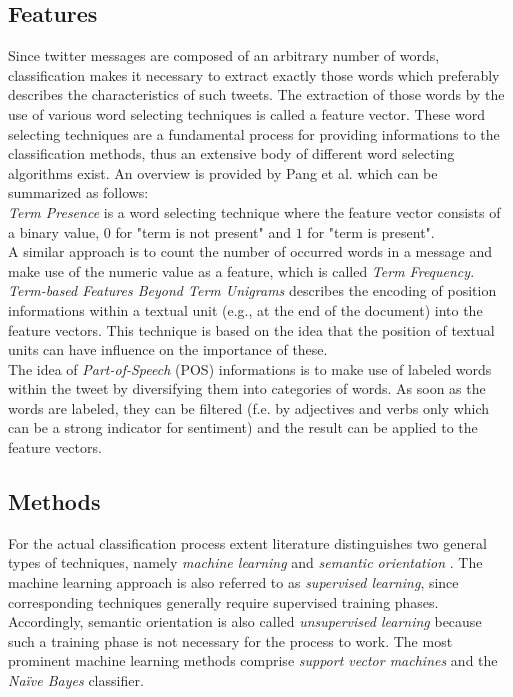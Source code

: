 \subsection{Features}
Since twitter messages are composed of an arbitrary number of words, classification makes it necessary to extract exactly those words which preferably describes the characteristics of such tweets. The extraction of those words by the use of various word selecting techniques is called a  feature vector. These word selecting techniques are a fundamental process for providing informations to the classification methods, thus an extensive body of different word selecting algorithms exist. An overview is provided by Pang et al. \autocite{Pang2008} which can be summarized as follows:\\
\emph{Term Presence} is a word selecting technique where the feature vector consists of a binary value, $0$ for "term is not present" and $1$ for "term is present".\\
A similar approach is to count the number of occurred words in a message and make use of the numeric value as a feature, which is called \emph{Term Frequency}.\\
\emph{Term-based Features Beyond Term Unigrams} describes the encoding of position informations within a textual unit (e.g., at the end of the document)  into the feature vectors. This technique is based on the idea that the position of textual units can have influence on the importance of these.\\
The idea of \emph{Part-of-Speech} (POS) informations is to make use of labeled words within the tweet by diversifying them into categories of words. As soon as the words are labeled, they can be filtered (f.e. by adjectives and verbs only which can be a strong indicator for sentiment) and the result can be applied to the feature vectors.\\

\subsection{Methods}

For the actual classification process extent literature distinguishes two general types of techniques, namely \emph{machine learning} and \emph{semantic orientation} \cite{Ye20096527}. The machine learning approach is also referred to as \emph{supervised learning}, since corresponding techniques generally require supervised training phases. Accordingly, semantic orientation is also called \emph{unsupervised learning} because such a training phase is not necessary for the process to work. The most prominent machine learning methods comprise \emph{support vector machines} and the \emph{Na\"ive Bayes} classifier.

